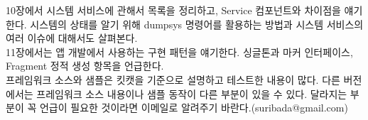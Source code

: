 \documentclass[a4paper,hidelinks,10pt,openany]{book} %
\begin{document}
10장에서 시스템 서비스에 관해서 목록을 정리하고, Service 컴포넌트와 차이점을 얘기한다. 시스템의 상태를 알기 위해 dumpsys 명령어를 활용하는 방법과 시스템 서비스의 여러 이슈에 대해서도 살펴본다.\\

11장에서는 앱 개발에서 사용하는 구현 패턴을 얘기한다. 싱글톤과 마커 인터페이스, Fragment 정적 생성 항목을 언급한다.\\

프레임워크 소스와 샘플은 킷캣을 기준으로 설명하고 테스트한 내용이 많다. 다른 버전에서는 프레임워크 소스 내용이나 샘플 동작이 다른 부분이 있을 수 있다. 달라지는 부분이 꼭 언급이 필요한 것이라면 이메일로 알려주기 바란다.(suribada@gmail.com)









%









\ 
%

%
%




\end{document}
